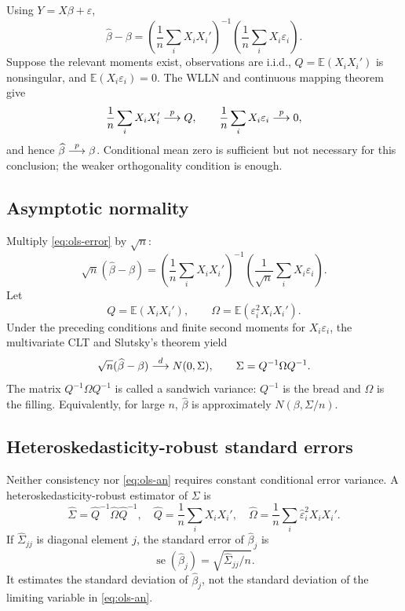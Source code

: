 Using $Y=X\beta+\varepsilon$,
\begin{equation}
\label{eq:ols-error}
  \widehat\beta-\beta
  =\left(\frac1n\sum_iX_iX_i'\right)^{-1}
   \left(\frac1n\sum_iX_i\varepsilon_i\right).
\end{equation}
Suppose the relevant moments exist, observations are i.i.d.,
$Q=\mathbb E(X_iX_i')$ is nonsingular, and
$\mathbb E(X_i\varepsilon_i)=0$.  The WLLN and continuous mapping theorem
give
\[
  \frac1n\sum_iX_iX_i'\overset{p}{\longrightarrow} Q,
  \qquad
  \frac1n\sum_iX_i\varepsilon_i\overset{p}{\longrightarrow}0,
\]
and hence $\widehat\beta\overset{p}{\longrightarrow}\beta$.  Conditional mean zero is sufficient but
not necessary for this conclusion; the weaker orthogonality condition is
enough.

\subsection{Asymptotic normality}

Multiply \eqref{eq:ols-error} by $\sqrt n$:
\[
  \sqrt n(\widehat\beta-\beta)
  =\left(\frac1n\sum_iX_iX_i'\right)^{-1}
   \left(\frac1{\sqrt n}\sum_iX_i\varepsilon_i\right).
\]
Let
\[
  Q=\mathbb E(X_iX_i'),
  \qquad
  \Omega=\mathbb E(\varepsilon_i^2X_iX_i').
\]
Under the preceding conditions and finite second moments for
$X_i\varepsilon_i$, the multivariate CLT and Slutsky's theorem yield
\begin{equation}
\label{eq:ols-an}
  \sqrt n(\widehat\beta-\beta)
  \overset{d}{\longrightarrow} N(0,\Sigma),
  \qquad
  \Sigma=Q^{-1}\Omega Q^{-1}.
\end{equation}
The matrix $Q^{-1}\Omega Q^{-1}$ is called a sandwich variance: $Q^{-1}$ is
the bread and $\Omega$ is the filling.  Equivalently, for large $n$,
$\widehat\beta$ is approximately $N(\beta,\Sigma/n)$.

\subsection{Heteroskedasticity-robust standard errors}

Neither consistency nor \eqref{eq:ols-an} requires constant conditional error
variance.  A heteroskedasticity-robust estimator of $\Sigma$ is
\begin{equation}
\label{eq:robust-av}
  \widehat\Sigma
  =\widehat Q^{-1}\widehat\Omega\widehat Q^{-1},
  \quad
  \widehat Q=\frac1n\sum_iX_iX_i',
  \quad
  \widehat\Omega=\frac1n\sum_i
       \widehat\varepsilon_i^2X_iX_i'.
\end{equation}
If $\widehat\Sigma_{jj}$ is diagonal element $j$, the standard error of
$\widehat\beta_j$ is
\[
  \operatorname{se}(\widehat\beta_j)
  =\sqrt{\widehat\Sigma_{jj}/n}.
\]
It estimates the standard deviation of $\widehat\beta_j$, not the standard
deviation of the limiting variable in \eqref{eq:ols-an}.

